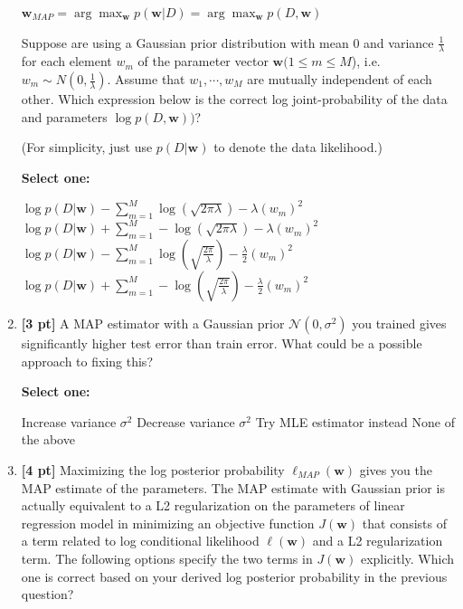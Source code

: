\documentclass[12pt,addpoints,answers]{exam}
\begin{document}
\begin{enumerate}
    $\mathbf{w}_{MAP} = \arg\max_{\mathbf{w}} p(\mathbf{w} | D) = \arg\max_{\mathbf{w}} p(D, \mathbf{w})$

    Suppose are using a Gaussian prior distribution with mean 0 and variance $\frac{1}{\lambda}$ for each element $w_m$  of the parameter vector $\mathbf{w} (1 \leq m \leq M $), i.e. $w_m \sim N(0, \frac{1}{\lambda})$. Assume that $w_1, \cdots, w_M$ are mutually independent of each other. Which expression below is the correct log joint-probability of the data and parameters $\log p(D, \mathbf{w}))$? 

    (For simplicity, just use $p(D|\mathbf{w})$ to denote the data likelihood.)

    \textbf{Select one:}
    \begin{checkboxes}
        \choice $\log p(D|\textbf{w}) - \sum_{m=1}^M \log(\sqrt{2\pi\lambda}) - \lambda (w_m)^2$
        \choice $\log p(D|\textbf{w}) + \sum_{m=1}^M -\log(\sqrt{2\pi\lambda}) - \lambda (w_m)^2$
        \choice $\log p(D|\textbf{w}) -  \sum_{m=1}^M \log(\sqrt{\frac{2\pi}{\lambda}}) - \frac{\lambda}{2}(w_m)^2$
        \choice $\log p(D|\textbf{w}) +  \sum_{m=1}^M -\log(\sqrt{\frac{2\pi}{\lambda}}) - \frac{\lambda}{2}(w_m)^2$
    \end{checkboxes}
    
    
    \clearpage
    
    \item \textbf{[3 pt]} A MAP estimator with a Gaussian prior $\mathcal{N}(0, \sigma^2)$ you trained gives significantly higher test error than train error. What could be a possible approach to fixing this? 

    \textbf{Select one:}
    \begin{checkboxes}
        \choice Increase variance $\sigma^2$
        \choice Decrease variance $\sigma^2$
        \choice Try MLE estimator instead
        \choice None of the above
    \end{checkboxes}
    
    
    \item \textbf{[4 pt]} Maximizing the log posterior probability  $\ell_{\textit{MAP}}(\mathbf{w})$ gives you the MAP estimate of the parameters. The MAP estimate with Gaussian prior is actually equivalent to a L2 regularization on the parameters of linear regression model in minimizing an objective function $J(\mathbf{w})$ that consists of a term related to log conditional likelihood $\ell(\mathbf{w})$ and a L2 regularization term. The following options specify the two terms in $J(\mathbf{w})$ explicitly. Which one is correct based on your derived log posterior probability in the previous question? 


\end{enumerate}
\end{document}
